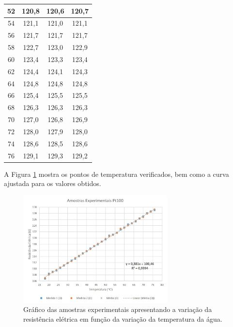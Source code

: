 \documentclass[a4paper]{instrumentacao}
\begin{document}
\begin{table}[H]
\begin{tabular}{|c|c|c|c|}
52                  & 120,8                 & 120,6                 & 120,7          \\ \hline
54                  & 121,1                 & 121,0                 & 121,1          \\ \hline
56                  & 121,7                 & 121,7                 & 121,7          \\ \hline
58                  & 122,7                 & 123,0                 & 122,9          \\ \hline
60                  & 123,4                 & 123,3                 & 123,4          \\ \hline
62                  & 124,4                 & 124,1                 & 124,3          \\ \hline
64                  & 124,8                 & 124,8                 & 124,8          \\ \hline
66                  & 125,4                 & 125,5                 & 125,5          \\ \hline
68                  & 126,3                 & 126,3                 & 126,3          \\ \hline
70                  & 127,0                 & 126,8                 & 126,9          \\ \hline
72                  & 128,0                 & 127,9                 & 128,0          \\ \hline
74                  & 128,6                 & 128,5                 & 128,6          \\ \hline
76                  & 129,1                 & 129,3                 & 129,2          \\ \hline
\end{tabular}
\end{table}

A Figura \ref{fig:pt100-amostras}  mostra os pontos de temperatura verificados, bem como a curva ajustada para os valores obtidos.

\begin{figure}[H]
\center
\includegraphics[width=0.7\textwidth]{pt100_puro.jpg}
\caption{Gráfico das amostras experimentais apresentando a variação da resistência elétrica em função da variação da temperatura da água.}
\label{fig:pt100-amostras}
\end{figure}
\end{document}
